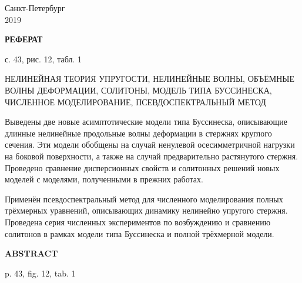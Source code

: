 \documentclass[12pt, a4paper]{report}
\begin{document}
\begin{titlepage}
	
	\vspace{30mm}
	
	\begin{center}
		Санкт-Петербург\\2019
	\end{center}
	
\end{titlepage}



\newpage
\thispagestyle{empty}
\begin{center}
	\textbf{РЕФЕРАТ}
	
	с. 43, рис. 12, табл. 1
\end{center}

НЕЛИНЕЙНАЯ ТЕОРИЯ УПРУГОСТИ, НЕЛИНЕЙНЫЕ ВОЛНЫ, ОБЪЁМНЫЕ ВОЛНЫ ДЕФОРМАЦИИ, СОЛИТОНЫ, МОДЕЛЬ ТИПА БУССИНЕСКА, ЧИСЛЕННОЕ МОДЕЛИРОВАНИЕ, ПСЕВДОСПЕКТРАЛЬНЫЙ МЕТОД

Выведены две новые асимптотические модели типа Буссинеска, описывающие длинные нелинейные продольные волны деформации в стержнях круглого сечения. Эти модели обобщены на случай ненулевой осесимметричной нагрузки на боковой поверхности, а также на случай предварительно растянутого стержня. Проведено сравнение дисперсионных свойств и солитонных решений новых моделей с моделями, полученными в прежних работах.

Применён псевдоспектральный метод для численного моделирования полных трёхмерных уравнений, описывающих динамику нелинейно упругого стержня. Проведена серия численных экспериментов по возбуждению и сравнению солитонов в рамках модели типа Буссинеска и полной трёхмерной модели.

\vspace{2cm}
\begin{center}
	\textbf{ABSTRACT}
	
	p. 43, fig. 12, tab. 1
\end{center}
\end{document}
